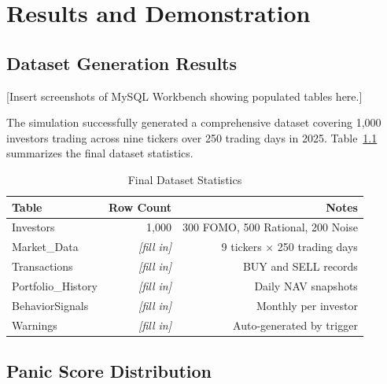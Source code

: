 \chapter{Results and Demonstration}
\label{chap:results}

\section{Dataset Generation Results}


[Insert screenshots of MySQL Workbench showing populated tables here.]

The simulation successfully generated a comprehensive dataset covering 1,000 investors trading across nine tickers over 250 trading days in 2025. Table~\ref{tab:dataset_final} summarizes the final dataset statistics.

\begin{table}[H]
    \centering
    \caption{Final Dataset Statistics}
    \label{tab:dataset_final}
    \begin{tabular}{lrr}
        \toprule
        \textbf{Table} & \textbf{Row Count} & \textbf{Notes} \\
        \midrule
        Investors & 1,000 & 300 FOMO, 500 Rational, 200 Noise \\
        Market\_Data & \textit{[fill in]} & 9 tickers × 250 trading days \\
        Transactions & \textit{[fill in]} & BUY and SELL records \\
        Portfolio\_History & \textit{[fill in]} & Daily NAV snapshots \\
        BehaviorSignals & \textit{[fill in]} & Monthly per investor \\
        Warnings & \textit{[fill in]} & Auto-generated by trigger \\
        \bottomrule
    \end{tabular}
\end{table}

\section{Panic Score Distribution}


